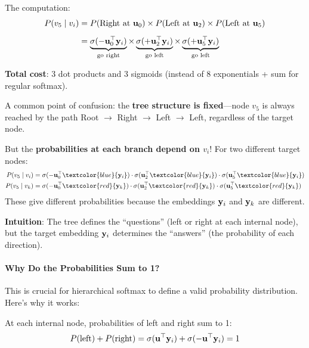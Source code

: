 \begin{notechapter}
\begin{example}
The computation:
\begin{align*}
P(v_5 \mid v_i) &= P(\text{Right at } \mathbf{u}_0) \times P(\text{Left at } \mathbf{u}_2) \times P(\text{Left at } \mathbf{u}_5) \\[0.5em]
&= \underbrace{\sigma(-\mathbf{u}_0^\top \mathbf{y}_i)}_{\text{go right}} \times \underbrace{\sigma(+\mathbf{u}_2^\top \mathbf{y}_i)}_{\text{go left}} \times \underbrace{\sigma(+\mathbf{u}_5^\top \mathbf{y}_i)}_{\text{go left}}
\end{align*}

\textbf{Total cost}: 3 dot products and 3 sigmoids (instead of 8 exponentials + sum for regular softmax).
\end{example}

\begin{remark}
A common point of confusion: the \textbf{tree structure is fixed}---node $v_5$ is always reached by the path Root $\to$ Right $\to$ Left $\to$ Left, regardless of the target node.

But the \textbf{probabilities at each branch depend on $v_i$}! For two different target nodes:
\begin{align*}
P(v_5 \mid v_i) &= \sigma(-\vect{u}_0^\top \textcolor{blue}{\vect{y}_i}) \cdot \sigma(\vect{u}_2^\top \textcolor{blue}{\vect{y}_i}) \cdot \sigma(\vect{u}_5^\top \textcolor{blue}{\vect{y}_i}) \\
P(v_5 \mid v_k) &= \sigma(-\vect{u}_0^\top \textcolor{red}{\vect{y}_k}) \cdot \sigma(\vect{u}_2^\top \textcolor{red}{\vect{y}_k}) \cdot \sigma(\vect{u}_5^\top \textcolor{red}{\vect{y}_k})
\end{align*}
These give different probabilities because the embeddings $\mathbf{y}_i$ and $\mathbf{y}_k$ are different.

\textbf{Intuition}: The tree defines the ``questions'' (left or right at each internal node), but the target embedding $\mathbf{y}_i$ determines the ``answers'' (the probability of each direction).
\end{remark}

\paragraph{Why Do the Probabilities Sum to 1?}

This is crucial for hierarchical softmax to define a valid probability distribution. Here's why it works:

At each internal node, probabilities of left and right sum to 1:
\[
P(\text{left}) + P(\text{right}) = \sigma(\mathbf{u}^\top \mathbf{y}_i) + \sigma(-\mathbf{u}^\top \mathbf{y}_i) = 1
\]


\end{notechapter}
